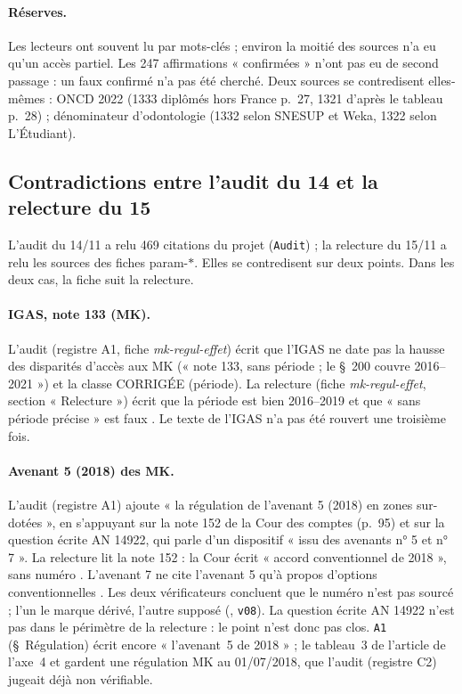 \paragraph{Réserves.} Les lecteurs ont souvent lu par mots-clés ; environ la moitié\mesure{} des sources n'a eu
qu'un accès partiel. Les 247 affirmations « confirmées » n'ont pas eu de second passage : un faux confirmé n'a
pas été cherché. Deux sources se contredisent elles-mêmes : ONCD 2022 (\num{1333}\mesure{} diplômés hors France
p.~27, \num{1321}\mesure{} d'après le tableau p.~28) ; dénominateur d'odontologie (\num{1332}\mesure{} selon
SNESUP et Weka, \num{1322}\mesure{} selon L'Étudiant).

\subsection{Contradictions entre l'audit du 14 et la relecture du 15}\label{par:contradictions}

L'audit du 14/11 a relu 469\mesure{} citations du projet (\texttt{Audit}) ; la relecture du 15/11 a relu les
sources des fiches param-$\ast$. Elles se contredisent sur deux points. Dans les deux cas, la fiche suit la
relecture.

\paragraph{IGAS, note 133 (MK).} L'audit (registre A1, fiche \emph{mk-regul-effet}) écrit que l'IGAS ne
date pas la hausse des disparités d'accès aux MK (« note 133, sans période ; le \S~200 couvre 2016--2021 ») et
la classe CORRIGÉE (période). La relecture (fiche \emph{mk-regul-effet}, section « Relecture ») écrit que la
période est bien 2016--2019 et que « sans période précise » est faux \citep{d-igas2023}. Le texte de l'IGAS n'a
pas été rouvert une troisième fois.

\paragraph{Avenant 5 (2018) des MK.} L'audit (registre A1) ajoute « la régulation de l'avenant 5 (2018) en zones
sur-dotées », en s'appuyant sur la note 152 de la Cour des comptes (p.~95) et sur la question écrite AN 14922,
qui parle d'un dispositif « issu des avenants n° 5 et n° 7 ». La relecture lit la note 152 : la Cour écrit
« accord conventionnel de 2018 », sans numéro \citep{d-ccomptes2024}. L'avenant 7 ne cite l'avenant 5 qu'à
propos d'options conventionnelles \citep{d-avenant7mk}. Les deux vérificateurs concluent que le numéro n'est
pas sourcé ; l'un le marque dérivé, l'autre supposé (, \texttt{v08}). La question
écrite AN 14922 n'est pas dans le périmètre de la relecture : le point n'est donc pas clos. \texttt{A1} (\S~Régulation)
écrit encore « l'avenant~5 de 2018 » ; le tableau~3 de l'article de l'axe~4 et 
gardent une régulation MK au 01/07/2018, que l'audit (registre C2) jugeait déjà non vérifiable.

